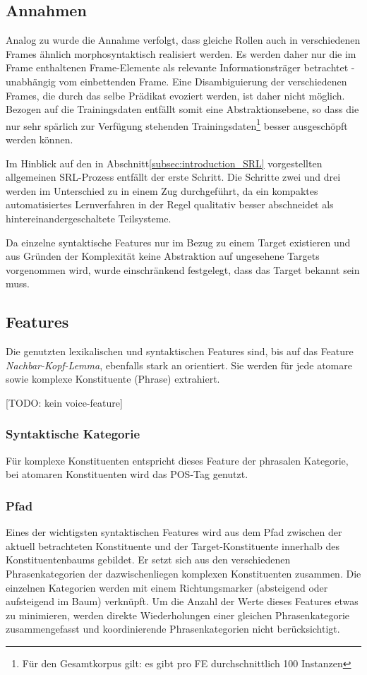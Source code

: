 \documentclass[12pt]{article}
\begin{document}
\subsection{Annahmen}

Analog zu \cite{gildea} wurde die Annahme verfolgt, dass gleiche Rollen auch in verschiedenen Frames ähnlich morphosyntaktisch realisiert werden. Es werden daher nur die im Frame enthaltenen Frame-Elemente als relevante Informationsträger betrachtet - unabhängig vom einbettenden Frame. Eine Disambiguierung der verschiedenen Frames, die durch das selbe Prädikat evoziert werden, ist daher nicht möglich. Bezogen auf die Trainingsdaten entfällt somit eine Abstraktionsebene, so dass die nur sehr spärlich zur Verfügung stehenden Trainingsdaten\footnote{Für den Gesamtkorpus gilt: es gibt pro FE durchschnittlich 100 Instanzen} besser ausgeschöpft werden können.

Im Hinblick auf den in Abschnitt\ref{subsec:introduction_SRL} vorgestellten allgemeinen SRL-Prozess entfällt der erste Schritt. Die Schritte zwei und drei werden im Unterschied zu \cite{gildea} in einem Zug durchgeführt, da ein kompaktes automatisiertes Lernverfahren in der Regel qualitativ besser abschneidet als hintereinandergeschaltete Teilsysteme.

Da einzelne syntaktische Features nur im Bezug zu einem Target existieren und aus Gründen der Komplexität keine Abstraktion auf ungesehene Targets vorgenommen wird, wurde einschränkend festgelegt, dass das Target bekannt sein muss.

\subsection{Features}
Die genutzten lexikalischen und syntaktischen Features sind, bis auf das Feature \textit{Nachbar-Kopf-Lemma}, ebenfalls stark an \cite{gildea} orientiert. Sie werden für jede atomare sowie komplexe Konstituente (Phrase) extrahiert.

[TODO: kein voice-feature]


\subsubsection*{Syntaktische Kategorie}
Für komplexe Konstituenten entspricht dieses Feature der phrasalen Kategorie, bei atomaren Konstituenten wird das POS-Tag genutzt.
\subsubsection*{Pfad}
Eines der wichtigsten syntaktischen Features wird aus dem Pfad zwischen der aktuell betrachteten Konstituente und der Target-Konstituente innerhalb des Konstituentenbaums gebildet. Er setzt sich aus den verschiedenen Phrasenkategorien der dazwischenliegen komplexen Konstituenten zusammen. Die einzelnen Kategorien werden mit einem Richtungsmarker (absteigend oder aufsteigend im Baum) verknüpft. Um die Anzahl der Werte dieses Features etwas zu minimieren, werden direkte Wiederholungen einer gleichen Phrasenkategorie zusammengefasst und koordinierende Phrasenkategorien nicht berücksichtigt.
\end{document}
